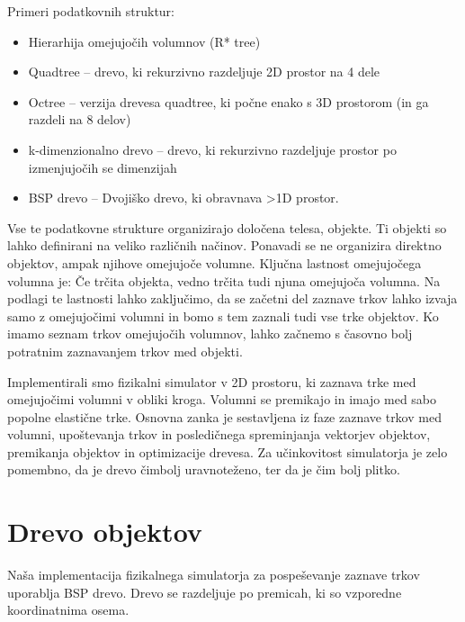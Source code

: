 \documentclass[a4paper,12pt]{article}
\begin{document}
Primeri podatkovnih struktur:
\begin{itemize}
    \item Hierarhija omejujočih volumnov (R* tree)
    \item Quadtree -- drevo, ki rekurzivno razdeljuje 2D prostor na 4 dele
    \item Octree -- verzija drevesa quadtree, ki počne enako s 3D prostorom (in ga razdeli na 8 delov)
    \item k-dimenzionalno drevo -- drevo, ki rekurzivno razdeljuje prostor po izmenjujočih se dimenzijah
    \item BSP drevo -- Dvojiško drevo, ki obravnava >1D prostor.
\end{itemize}


Vse te podatkovne strukture organizirajo določena telesa, objekte. Ti objekti so lahko definirani na veliko različnih načinov. Ponavadi se ne organizira direktno objektov, ampak njihove omejujoče volumne. Ključna lastnost omejujočega volumna je:
Če trčita objekta, vedno trčita tudi njuna omejujoča volumna.
Na podlagi te lastnosti lahko zaključimo, da se začetni del zaznave trkov lahko izvaja samo z omejujočimi volumni in bomo s tem zaznali tudi vse trke objektov.
Ko imamo seznam trkov omejujočih volumnov, lahko začnemo s časovno bolj potratnim zaznavanjem trkov med objekti.



Implementirali smo fizikalni simulator v 2D prostoru, ki zaznava trke med omejujočimi volumni
v obliki kroga. Volumni se premikajo in imajo med sabo popolne elastične trke.
Osnovna zanka je sestavljena iz faze zaznave trkov med volumni, upoštevanja trkov in posledičnega
spreminjanja vektorjev objektov, premikanja objektov in optimizacije drevesa. Za učinkovitost
simulatorja je zelo pomembno, da je drevo čimbolj uravnoteženo, ter da je čim bolj plitko.
\section{Drevo objektov}
Naša implementacija fizikalnega simulatorja za pospeševanje zaznave trkov uporablja BSP drevo.
Drevo se razdeljuje po premicah, ki so vzporedne koordinatnima osema.
\end{document}
